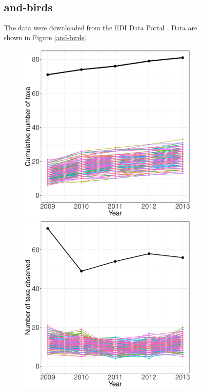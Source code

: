 \documentclass[11pt, oneside]{article}
\begin{document}
\begin{figure}[h!]
\subsection {and-birds}
The data were downloaded from the EDI Data Portal \citep{and-birds}.
Data are shown in Figure \ref{and-birds}.

\begin{figure}[h!]
\centering
\includegraphics[scale = 0.4]{and-birds-wisnoski_species_accumulation_curve.pdf}
\includegraphics[scale = 0.4]{and-birds-wisnoski_num_taxa_over_time.pdf}

\end{figure}
\end{figure}
\end{document}
